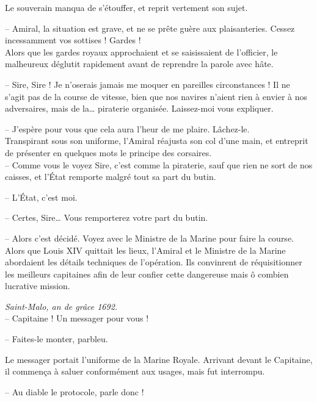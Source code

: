 Le souverain manqua de s'étouffer, et reprit vertement son sujet.

-- Amiral, la situation est grave, et ne se prête guère aux
   plaisanteries. Cessez incessamment vos sottises ! Gardes !\\

Alors que les gardes royaux approchaient et se saisissaient de
l'officier, le malheureux déglutit rapidement avant de reprendre la
parole avec hâte.

-- Sire, Sire ! Je n'oserais jamais me moquer en pareilles
   circonstances ! Il ne s'agit pas de la course de vitesse, bien que
   nos navires n'aient rien à envier à nos adversaires, mais de
   la\ldots{} piraterie organisée. Laissez-moi vous expliquer.

-- J'espère pour vous que cela aura l'heur de me plaire. Lâchez-le.\\

Transpirant sous son uniforme, l'Amiral réajusta son col d'une main,
et entreprit de présenter en quelques mots le principe des
corsaires.\\

-- Comme vous le voyez Sire, c'est comme la piraterie, sauf que rien
   ne sort de nos caisses, et l'État remporte malgré tout sa part du
   butin.

-- L'État, c'est moi.

-- Certes, Sire\ldots{} Vous remporterez votre part du butin.

-- Alors c'est décidé. Voyez avec le Ministre de la Marine pour faire
   la course.\\

Alors que Louis XIV quittait les lieux, l'Amiral et le Ministre de la
Marine abordaient les détails techniques de l'opération. Ils
convinrent de réquisitionner les meilleurs capitaines afin de leur
confier cette dangereuse mais ô combien lucrative mission.

\culdelampe{}

{\selectfont \textit{Saint-Malo, an de grâce 1692.}}\\

-- Capitaine ! Un messager pour vous !

-- Faites-le monter, parbleu.

Le messager portait l'uniforme de la Marine Royale. Arrivant devant le
Capitaine, il commença à saluer conformément aux usages, mais fut
interrompu.

-- Au diable le protocole, parle donc !

